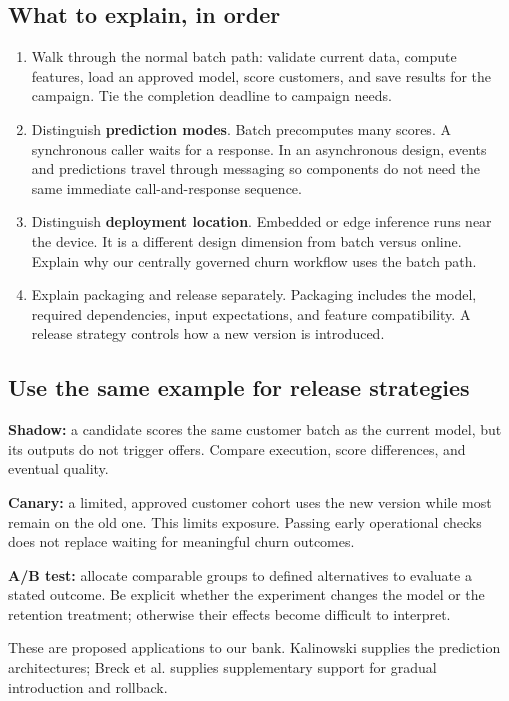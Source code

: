 \documentclass[12pt,a4paper]{article}
\begin{document}
\subsection{What to explain, in order}
\begin{enumerate}
\item Walk through the normal batch path: validate current data, compute features, load an approved model, score customers, and save results for the campaign. Tie the completion deadline to campaign needs.
\item Distinguish \textbf{prediction modes}. Batch precomputes many scores. A synchronous caller waits for a response. In an asynchronous design, events and predictions travel through messaging so components do not need the same immediate call-and-response sequence.
\item Distinguish \textbf{deployment location}. Embedded or edge inference runs near the device. It is a different design dimension from batch versus online. Explain why our centrally governed churn workflow uses the batch path.
\item Explain packaging and release separately. Packaging includes the model, required dependencies, input expectations, and feature compatibility. A release strategy controls how a new version is introduced.
\end{enumerate}

\subsection{Use the same example for release strategies}
\textbf{Shadow:} a candidate scores the same customer batch as the current model, but its outputs do not trigger offers. Compare execution, score differences, and eventual quality.

\textbf{Canary:} a limited, approved customer cohort uses the new version while most remain on the old one. This limits exposure. Passing early operational checks does not replace waiting for meaningful churn outcomes.

\textbf{A/B test:} allocate comparable groups to defined alternatives to evaluate a stated outcome. Be explicit whether the experiment changes the model or the retention treatment; otherwise their effects become difficult to interpret.

These are proposed applications to our bank. Kalinowski supplies the prediction architectures; Breck et al. supplies supplementary support for gradual introduction and rollback.
\end{document}

